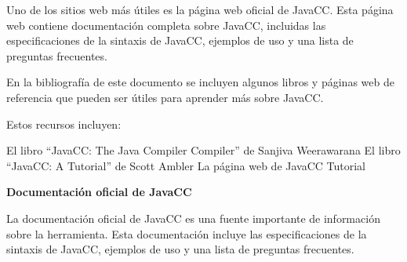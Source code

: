 Uno de los sitios web más útiles es la página web oficial de JavaCC. Esta página web contiene documentación completa sobre JavaCC, incluidas las especificaciones de la sintaxis de JavaCC, ejemplos de uso y una lista de preguntas frecuentes.

En la bibliografía de este documento se incluyen algunos libros y páginas web de referencia que pueden ser útiles para aprender más sobre JavaCC.

Estos recursos incluyen:

    El libro ``JavaCC: The Java Compiler Compiler'' de Sanjiva Weerawarana
    El libro ``JavaCC: A Tutorial'' de Scott Ambler
    La página web de JavaCC Tutorial

\textbf{Documentación oficial de JavaCC}

La documentación oficial de JavaCC es una fuente importante de información sobre la herramienta. Esta documentación incluye las especificaciones de la sintaxis de JavaCC, ejemplos de uso y una lista de preguntas frecuentes.
